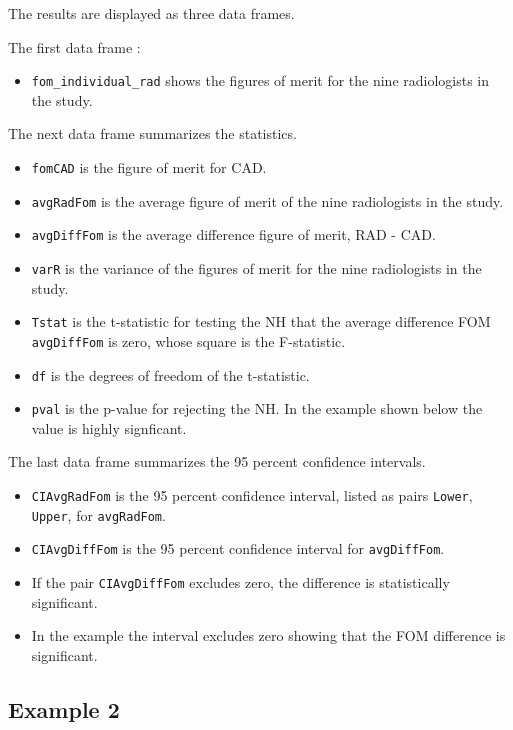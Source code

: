 \documentclass[
]{book}
\providecommand{\tightlist}{%
  \setlength{\itemsep}{0pt}\setlength{\parskip}{0pt}}
\begin{document}
The results are displayed as three data frames.

The first data frame :

\begin{itemize}
\tightlist
\item
  \texttt{fom\_individual\_rad} shows the figures of merit for the nine radiologists in the study.
\end{itemize}

The next data frame summarizes the statistics.

\begin{itemize}
\tightlist
\item
  \texttt{fomCAD} is the figure of merit for CAD.
\item
  \texttt{avgRadFom} is the average figure of merit of the nine radiologists in the study.
\item
  \texttt{avgDiffFom} is the average difference figure of merit, RAD - CAD.
\item
  \texttt{varR} is the variance of the figures of merit for the nine radiologists in the study.
\item
  \texttt{Tstat} is the t-statistic for testing the NH that the average difference FOM \texttt{avgDiffFom} is zero, whose square is the F-statistic.
\item
  \texttt{df} is the degrees of freedom of the t-statistic.
\item
  \texttt{pval} is the p-value for rejecting the NH. In the example shown below the value is highly signficant.
\end{itemize}

The last data frame summarizes the 95 percent confidence intervals.

\begin{itemize}
\tightlist
\item
  \texttt{CIAvgRadFom} is the 95 percent confidence interval, listed as pairs \texttt{Lower}, \texttt{Upper}, for \texttt{avgRadFom}.
\item
  \texttt{CIAvgDiffFom} is the 95 percent confidence interval for \texttt{avgDiffFom}.
\item
  If the pair \texttt{CIAvgDiffFom} excludes zero, the difference is statistically significant.
\item
  In the example the interval excludes zero showing that the FOM difference is significant.
\end{itemize}

\hypertarget{example-2}{%
\subsection{Example 2}\label{example-2}}
\end{document}
